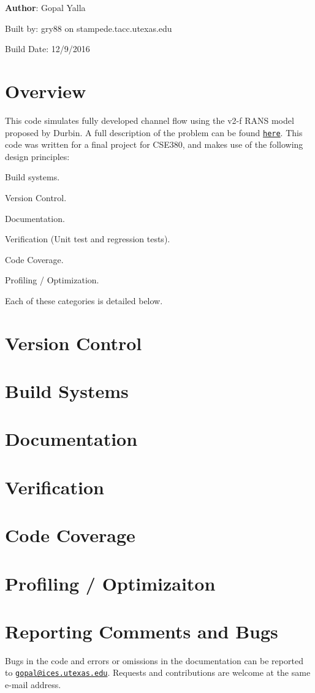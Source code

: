 {\bfseries Author}: Gopal Yalla

Built by: gry88 on stampede.tacc.utexas.edu

Build Date: 12/9/2016 

\hypertarget{index_Overview}{}\section{Overview}\label{index_Overview}


This code simulates fully developed channel flow using the v2-\/f RANS model proposed by Durbin. A full description of the problem can be found \href{http://users.ices.utexas.edu/~gopal/public/Problem_Statement.pdf}{\tt here}. This code was written for a final project for CSE380, and makes use of the following design principles:


\begin{DoxyItemize}
\item Build systems. 
\item Version Control. 
\item Documentation. 
\item Verification (Unit test and regression tests). 
\item Code Coverage. 
\item Profiling / Optimization. 
\end{DoxyItemize}

Each of these categories is detailed below.\hypertarget{index_vc}{}\section{Version Control}\label{index_vc}
\hypertarget{index_make}{}\section{Build Systems}\label{index_make}
\hypertarget{index_doc}{}\section{Documentation}\label{index_doc}
\hypertarget{index_test}{}\section{Verification}\label{index_test}
\hypertarget{index_coverage}{}\section{Code Coverage}\label{index_coverage}
\hypertarget{index_opt}{}\section{Profiling / Optimizaiton}\label{index_opt}
\hypertarget{index_bugs}{}\section{Reporting Comments and Bugs}\label{index_bugs}
Bugs in the code and errors or omissions in the documentation can be reported to \href{mailto:gopal@ices.utexas.edu}{\tt gopal@ices.utexas.edu}. Requests and contributions are welcome at the same e-\/mail address. 